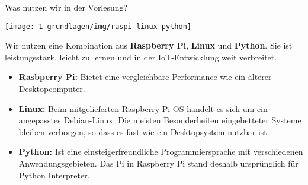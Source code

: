 \begin{frame}{Was nutzen wir in der Vorlesung?}
    \begin{center}
        \texttt{[image: 1-grundlagen/img/raspi-linux-python]}
    \end{center}

    \bigskip

    \parbox{\linewidth}{
        \footnotesize
        Wir nutzen eine Kombination aus \textbf{Raspberry Pi}, \textbf{Linux} und
        \textbf{Python}. Sie ist leistungsstark, leicht zu lernen und in der
        IoT-Entwicklung weit verbreitet.

        \medskip

        \begin{itemize}
            \item \textbf{Rasbperry Pi:} Bietet eine vergleichbare Performance wie
            ein älterer Desktopcomputer.

            \item \textbf{Linux:} Beim mitgelieferten Raspberry Pi OS handelt es
            sich um ein angepasstes Debian-Linux. Die meisten Besonderheiten
            eingebetteter Systeme bleiben verborgen, so dass es fast wie ein
            Desktopsystem nutzbar ist.

            \item \textbf{Python:} Ist eine einsteigerfreundliche Programmiersprache
            mit verschiedenen Anwendungsgebieten. Das Pi in Raspberry Pi stand
            deshalb ursprünglich für \glqq{}Python Interpreter\grqq{}.
        \end{itemize}
    }
\end{frame}



